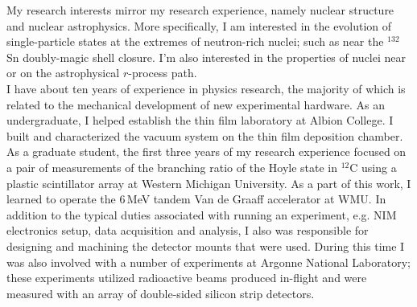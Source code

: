 My research interests mirror my research experience, namely nuclear structure and nuclear astrophysics.  More specifically, I am interested in the evolution of single-particle states at the extremes of neutron-rich nuclei; such as near the $^{132}$Sn doubly-magic shell closure.  I'm also interested in the properties of nuclei near or on the astrophysical $r$-process path.\\

I have about ten years of experience in physics research, the majority of which is related to the mechanical development of new experimental hardware.  As an undergraduate, I helped establish the thin film laboratory at Albion College.  I built and characterized the vacuum system on the thin film deposition chamber.  As a graduate student, the first three years of my research experience focused on a pair of measurements of the branching ratio of the Hoyle state in $^{12}$C using a plastic scintillator array at Western Michigan University.  As a part of this work, I learned to operate the 6\,MeV tandem Van de Graaff accelerator at WMU.  In addition to the typical duties associated with running an experiment, e.g. NIM electronics setup, data acquisition and analysis, I also was responsible for designing and machining the detector mounts that were used.  During this time I was also involved with a number of experiments at Argonne National Laboratory; these experiments utilized radioactive beams produced in-flight and were measured with an array of double-sided silicon strip detectors.\\


